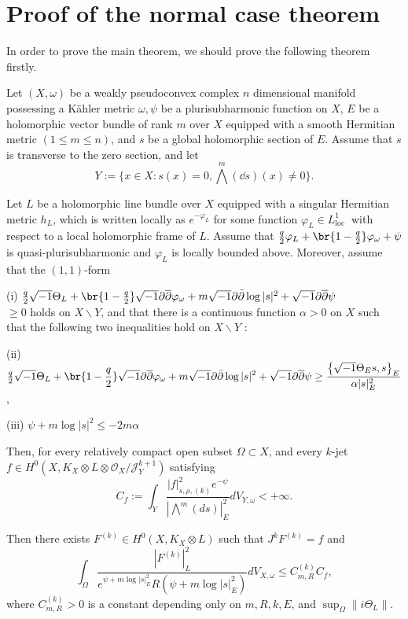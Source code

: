 \documentclass[lang=en,12pt,twoside]{textbook}
\begin{document}
\section{Proof of the normal case theorem}
In order to prove the main theorem, we should prove the following theorem firstly.
\begin{theorem}\label{thm:L2}
  Let $(X, \omega)$ be a weakly pseudoconvex complex $n$ dimensional manifold possessing a Kähler metric $\omega, \psi$ be a plurisubharmonic function on $X$, $E$ be a holomorphic vector bundle of rank $m$ over $X$ equipped with a smooth Hermitian metric $(1 \leq m\leq n)$, and $s$ be a global holomorphic section of $E$. Assume that $s$ is transverse to the zero section, and let
$$
Y:=\{x \in X: s(x)=0, \bigwedge^m (\dd s)(x)\neq 0\} .
$$

Let $L$ be a holomorphic line bundle over $X$ equipped with a singular Hermitian metric $h_L$, which is written locally as $e^{-\varphi_L}$ for some function $\varphi_L \in L_{\text {loc }}^1$ with respect to a local holomorphic frame of $L$. Assume that $\frac{q}{2}\varphi_L+\br{1-\frac{q}{2}}\varphi_\omega+\psi$ is quasi-plurisubharmonic and $\varphi_L$ is locally bounded above.  Moreover, assume that the $(1,1)$-form  \vspace{.25em}

{\upshape (i)}\vspace{.25em} $\frac{q}{2}\sqrt{-1} \Theta_L+\br{1-\frac{q}{2}}\sqrt{-1}\bd\bdd\varphi_\omega+ m\sqrt{-1} \partial \bar{\partial} \log |s|^2+\xu\bd\bdd \psi $\\$\geq 0$ holds on $X \backslash Y$, \newline
and that there is a continuous function $\alpha>0$ on $X$ such that the following two inequalities hold on $X \backslash Y$ :

{\upshape (ii)} $\frac{q}{2}\displaystyle\sqrt{-1} \Theta_L+\br{1-\frac{q}{2}}\sqrt{-1}\bd\bdd\varphi_\omega+m\sqrt{-1} \partial \bar{\partial} \log |s|^2+\xu\bd\bdd \psi \geq \frac{\left\{\sqrt{-1} \Theta_E s, s\right\}_E}{\alpha|s|_E^2}$,

{\upshape (iii) }$\psi+m\log |s|^2\leq-2 m\alpha$ 

\noindent Then, for every relatively compact open subset $\Omega \subset X$, and every $k$-jet $f \in H^0\left(X, K_X\otimes L \otimes \mathcal{O}_X / \mathcal{J}_Y^{k+1}\right)$ satisfying
$$
C_f :=\int_Y \frac{|f|_{s, \rho,(k)}^2 e^{-\psi} }{\left|\bigwedge^m(d s)\right|^{2}_E }d V_{Y, \omega}<+\infty.
$$

Then there exists $F^{(k)} \in H^0\left(X, K_X \otimes L\right)$ such that $J^k F^{(k)}=f$ and
$$
\int_{\Omega} \frac{\left|F^{(k)}\right|_L^2}{e^{\psi+m\log |s|^2_E} R(\psi+m\log |s|^2_E)} d V_{X, \omega} \leq C_{m,R}^{(k)} C_f,
$$
where $C_{m,R}^{(k)}>0$ is a constant depending only on $m,R,k, E$, and $\sup _{\Omega}\|i \Theta_L\|$.

\end{theorem}
\end{document}

